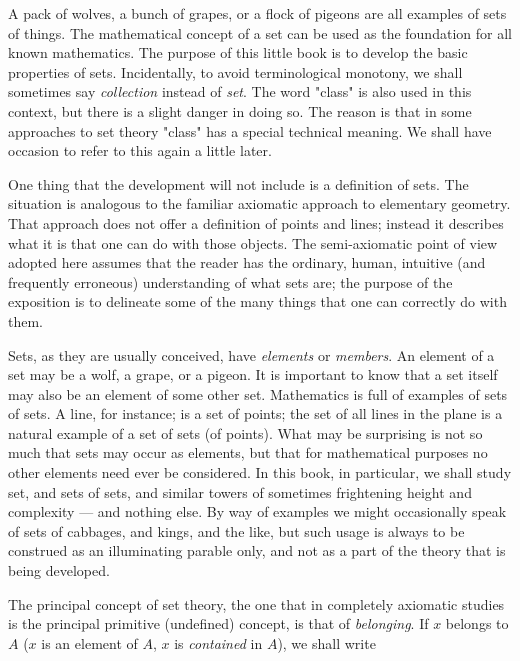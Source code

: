
A pack of wolves, a bunch of grapes, or a flock of pigeons are all examples of sets of things. The mathematical concept of a set can be used as the foundation for all known mathematics. The purpose of this little book is to develop the basic properties of sets. Incidentally, to avoid terminological monotony, we shall sometimes say \textit{collection} instead of \textit{set}. The word "class" is also used in this context, but there is a slight danger in doing so. The reason is that in some approaches to set theory "class" has a special technical meaning. We shall have occasion to refer to this again a little later.

One thing that the development will not include is a definition of sets. The situation is analogous to the familiar axiomatic approach to elementary geometry. That approach does not offer a definition of points and lines; instead it describes what it is that one can do with those objects. The semi-axiomatic point of view adopted here assumes that the reader has the ordinary, human, intuitive (and frequently erroneous) understanding of what sets are; the purpose of the exposition is to delineate some of the many things that one can correctly do with them.

Sets, as they are usually conceived, have \textit{elements} or \textit{members}. An element of a set may be a wolf, a grape, or a pigeon. It is important to know that a set itself may also be an element of some other set. Mathematics is full of examples of sets of sets. A line, for instance; is a set of points; the set of all lines in the plane is a natural example of a set of sets (of points). What may be surprising is not so much that sets may occur as elements, but that for mathematical purposes no other elements need ever be considered. In this book, in particular, we shall study set, and sets of sets, and similar towers of sometimes frightening height and complexity — and nothing else. By way of examples we might occasionally speak of sets of cabbages, and kings, and the like, but such usage is always to be construed as an illuminating parable only, and not as a part of the theory that is being developed. 

The principal concept of set theory, the one that in completely axiomatic studies is the principal primitive (undefined) concept, is that of \textit{belonging}. If $x$ belongs to $A$ ($x$ is an element of $A$, $x$ is \textit{contained} in $A$), we shall write 

